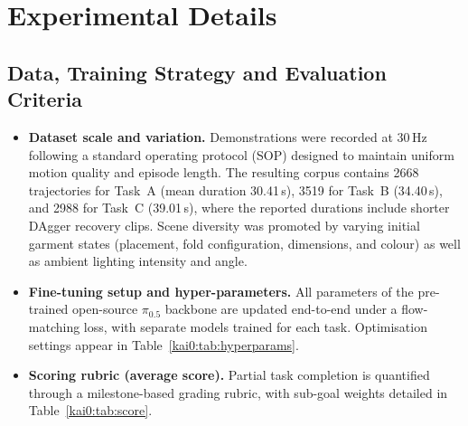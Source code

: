 \section{Experimental Details}\label{kai0:app:exp}

\subsection{Data, Training Strategy and Evaluation Criteria}\label{kai0:app:data}
\begin{itemize}
  \item \textbf{Dataset scale and variation.} Demonstrations were recorded at 30\,Hz following a standard operating protocol (SOP) designed to maintain uniform motion quality and episode length. The resulting corpus contains 2668 trajectories for Task~A (mean duration 30.41\,s), 3519 for Task~B (34.40\,s), and 2988 for Task~C (39.01\,s), where the reported durations include shorter DAgger recovery clips. Scene diversity was promoted by varying initial garment states (placement, fold configuration, dimensions, and colour) as well as ambient lighting intensity and angle.
  \item \textbf{Fine-tuning setup and hyper-parameters.} All parameters of the pre-trained open-source $\pi_{0.5}$ backbone are updated end-to-end under a flow-matching loss, with separate models trained for each task. Optimisation settings appear in Table~\ref{kai0:tab:hyperparams}.
  \item \textbf{Scoring rubric (average score).} Partial task completion is quantified through a milestone-based grading rubric, with sub-goal weights detailed in Table~\ref{kai0:tab:score}.
\end{itemize}


